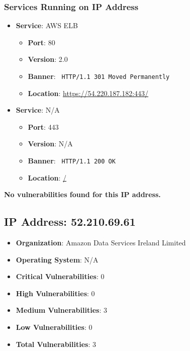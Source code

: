 \documentclass{article}
\begin{document}
\subsubsection*{Services Running on IP Address}

\begin{itemize}
    
        \item \textbf{Service}: AWS ELB
        \begin{itemize}
            \item \textbf{Port}: 80
            \item \textbf{Version}:  2.0 
            \item \textbf{Banner}: \texttt{
                HTTP/1.1 301 Moved Permanently
            }
            \item \textbf{Location}: \href{ https://54.220.187.182:443/ }{ https://54.220.187.182:443/ }
        \end{itemize}
    
        \item \textbf{Service}: N/A
        \begin{itemize}
            \item \textbf{Port}: 443
            \item \textbf{Version}:  N/A 
            \item \textbf{Banner}: \texttt{
                HTTP/1.1 200 OK
            }
            \item \textbf{Location}: \href{ / }{ / }
        \end{itemize}
    
\end{itemize}


\textbf{No vulnerabilities found for this IP address.}




\clearpage



\subsection*{IP Address: 52.210.69.61}

\begin{itemize}
    \item \textbf{Organization}: Amazon Data Services Ireland Limited
    \item \textbf{Operating System}:  N/A 
    \item \textbf{Critical Vulnerabilities}: 0
    \item \textbf{High Vulnerabilities}: 0
    \item \textbf{Medium Vulnerabilities}: 3
    \item \textbf{Low Vulnerabilities}: 0
    \item \textbf{Total Vulnerabilities}: 3
\end{itemize}
\end{document}
